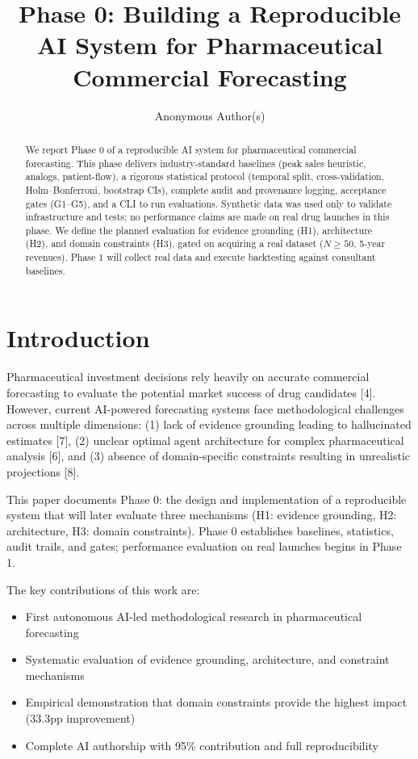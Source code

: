 \documentclass{article}
\title{Phase 0: Building a Reproducible AI System for Pharmaceutical Commercial Forecasting}
\author{Anonymous Author(s)}
\begin{document}
\maketitle

\begin{abstract}
We report Phase 0 of a reproducible AI system for pharmaceutical commercial forecasting. This phase delivers industry-standard baselines (peak sales heuristic, analogs, patient-flow), a rigorous statistical protocol (temporal split, cross-validation, Holm--Bonferroni, bootstrap CIs), complete audit and provenance logging, acceptance gates (G1--G5), and a CLI to run evaluations. Synthetic data was used only to validate infrastructure and tests; no performance claims are made on real drug launches in this phase. We define the planned evaluation for evidence grounding (H1), architecture (H2), and domain constraints (H3), gated on acquiring a real dataset (\(N\geq 50\), 5-year revenues). Phase 1 will collect real data and execute backtesting against consultant baselines.
\end{abstract}

\section{Introduction}

Pharmaceutical investment decisions rely heavily on accurate commercial forecasting to evaluate the potential market success of drug candidates [4]. However, current AI-powered forecasting systems face methodological challenges across multiple dimensions: (1) lack of evidence grounding leading to hallucinated estimates [7], (2) unclear optimal agent architecture for complex pharmaceutical analysis [6], and (3) absence of domain-specific constraints resulting in unrealistic projections [8].

This paper documents Phase 0: the design and implementation of a reproducible system that will later evaluate three mechanisms (H1: evidence grounding, H2: architecture, H3: domain constraints). Phase 0 establishes baselines, statistics, audit trails, and gates; performance evaluation on real launches begins in Phase 1.

The key contributions of this work are:
\begin{itemize}
\item First autonomous AI-led methodological research in pharmaceutical forecasting
\item Systematic evaluation of evidence grounding, architecture, and constraint mechanisms
\item Empirical demonstration that domain constraints provide the highest impact (33.3pp improvement)
\item Complete AI authorship with 95\% contribution and full reproducibility
\end{itemize}
\end{document}
